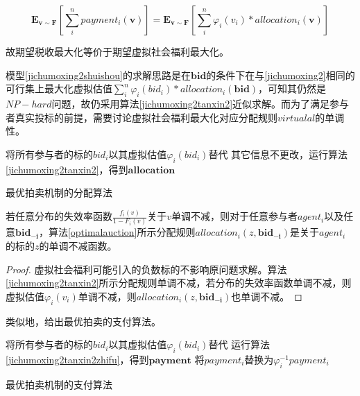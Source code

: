 \documentclass[promaster]{thesis-uestc}
\begin{document}
\begin{equation}
    \mathbf{E}_{\mathbf{v}\sim\mathbf{F}}{\left[\sum_{i}^{n}{payment_i(\mathbf{v})}\right]}=\mathbf{E}_{\mathbf{v}\sim\mathbf{F}}{\left[\sum_{i}^{n}{\varphi _i(v_i)*allocation_i(\mathbf{v})}\right]}
\end{equation}

故期望税收最大化等价于期望虚拟社会福利最大化。

模型\ref{jichumoxing2shuishou}的求解思路是在$\mathbf{bid}$的条件下在与\ref{jichumoxing2}相同的可行集上最大化虚拟估值$\sum_{i}^{n}{\varphi _i(bid_i)*allocation_i(\mathbf{bid})}$，可知其仍然是$NP-hard$问题，故仍采用算法\ref{jichumoxing2tanxin2}近似求解。而为了满足参与者真实投标的前提，需要讨论虚拟社会福利最大化对应分配规则$virtualal$的单调性。

\begin{algorithm}[H] 
    将所有参与者的标的$bid_i$以其虚拟估值$\varphi _i(bid_i)$替代\;
    其它信息不更改，运行算法\ref{jichumoxing2tanxin2}，得到$\mathbf{allocation}$\;
\caption{最优拍卖机制的分配算法}
\label{optimalauction}
\end{algorithm}

\begin{theorem}
若任意分布的失效率函数$\frac{f_i(v)}{1-F_i(v)}$关于$v$单调不减，则对于任意参与者$agent_i$以及任意$\mathbf{bid_{-i}}$，算法\ref{optimalauction}所示分配规则$allocation_i(z,\mathbf{bid_{-i}})$是关于$agent_i$的标的$z$的单调不减函数。
\end{theorem}

\begin{proof}
虚拟社会福利可能引入的负数标的不影响原问题求解。算法\ref{jichumoxing2tanxin2}所示分配规则单调不减，若分布的失效率函数单调不减，则虚拟估值$\varphi _i(v_i)$单调不减，则$allocation_i(z,\mathbf{bid_{-i}})$也单调不减。
\end{proof}

类似地，给出最优拍卖的支付算法。

\begin{algorithm}[H] 
    将所有参与者的标的$bid_i$以其虚拟估值$\varphi _i(bid_i)$替代\;
    运行算法\ref{jichumoxing2tanxin2zhifu}，得到$\mathbf{payment}$\;
    {
        将$payment_i$替换为$\varphi _{i}^{-1}{payment_i}$
    }
\caption{最优拍卖机制的支付算法}
\label{optimalauctionzhifu}
\end{algorithm}

\FloatBarrier
\end{document}
